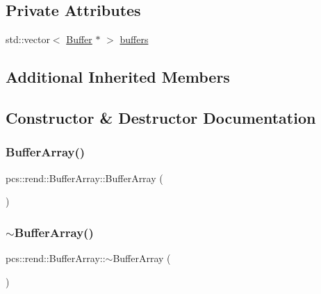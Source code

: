 \subsection*{Private Attributes}
\begin{DoxyCompactItemize}
\item 
std\+::vector$<$ \hyperlink{classpcs_1_1rend_1_1Buffer}{Buffer} $\ast$ $>$ \hyperlink{classpcs_1_1rend_1_1BufferArray_a9e2281d3dab3361dd8b9aca55c53e4a7}{buffers}
\end{DoxyCompactItemize}
\subsection*{Additional Inherited Members}


\subsection{Constructor \& Destructor Documentation}
\mbox{\label{classpcs_1_1rend_1_1BufferArray_a8e4885f9616165139b318a1b879691e5}} 
\subsubsection{\texorpdfstring{Buffer\+Array()}{BufferArray()}}
{\footnotesize\ttfamily pcs\+::rend\+::\+Buffer\+Array\+::\+Buffer\+Array (\begin{DoxyParamCaption}{ }\end{DoxyParamCaption})}

\mbox{\label{classpcs_1_1rend_1_1BufferArray_a4492755723fc99752c811bfe7520d993}} 
\subsubsection{\texorpdfstring{$\sim$\+Buffer\+Array()}{~BufferArray()}}
{\footnotesize\ttfamily pcs\+::rend\+::\+Buffer\+Array\+::$\sim$\+Buffer\+Array (\begin{DoxyParamCaption}{ }\end{DoxyParamCaption})\hspace{0.3cm}{\ttfamily [virtual]}}



